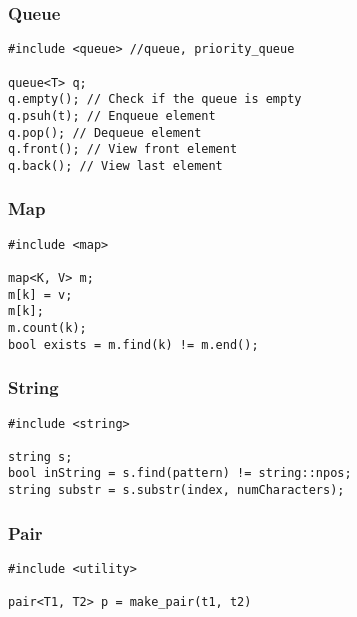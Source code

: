 \subsubsection{Queue}
\begin{lstlisting}[style=CStyle]
#include <queue> //queue, priority_queue

queue<T> q;
q.empty(); // Check if the queue is empty
q.psuh(t); // Enqueue element
q.pop(); // Dequeue element
q.front(); // View front element
q.back(); // View last element
\end{lstlisting}

\subsubsection{Map}
\begin{lstlisting}[style=CStyle]
#include <map>

map<K, V> m;
m[k] = v;
m[k];
m.count(k);
bool exists = m.find(k) != m.end();
\end{lstlisting}

\subsubsection{String}
\begin{lstlisting}[style=CStyle]
#include <string>

string s;
bool inString = s.find(pattern) != string::npos;
string substr = s.substr(index, numCharacters);
\end{lstlisting}

\subsubsection{Pair}
\begin{lstlisting}[style=CStyle]
#include <utility>

pair<T1, T2> p = make_pair(t1, t2)
\end{lstlisting}

\clearpage

